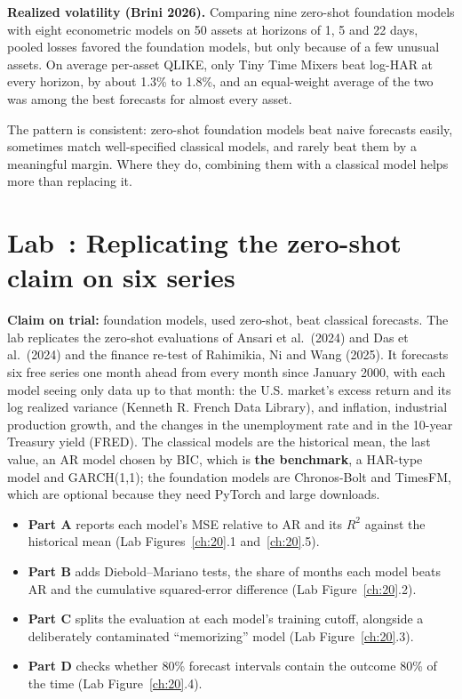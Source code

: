 \textbf{Realized volatility (Brini 2026).} Comparing nine zero-shot foundation models with eight econometric models on 50 assets at horizons of 1, 5 and 22 days, pooled losses favored the foundation models, but only because of a few unusual assets. On average per-asset QLIKE, only Tiny Time Mixers beat log-HAR at every horizon, by about 1.3\% to 1.8\%, and an equal-weight average of the two was among the best forecasts for almost every asset.

The pattern is consistent: zero-shot foundation models beat naive forecasts easily, sometimes match well-specified classical models, and rarely beat them by a meaningful margin. Where they do, combining them with a classical model helps more than replacing it.

\section{Lab~\thechapter: Replicating the zero-shot claim on six series}
\label{sec:21-lab}

\textbf{Claim on trial:} foundation models, used zero-shot, beat classical forecasts. The lab replicates the zero-shot evaluations of Ansari et al.\ (2024) and Das et al.\ (2024) and the finance re-test of Rahimikia, Ni and Wang (2025). It forecasts six free series one month ahead from every month since January 2000, with each model seeing only data up to that month: the U.S. market's excess return and its log realized variance (Kenneth R. French Data Library), and inflation, industrial production growth, and the changes in the unemployment rate and in the 10-year Treasury yield (FRED). The classical models are the historical mean, the last value, an AR model chosen by BIC, which is \textbf{the benchmark}, a HAR-type model and GARCH(1,1); the foundation models are Chronos-Bolt and TimesFM, which are optional because they need PyTorch and large downloads.

\begin{itemize}
  \item \textbf{Part A} reports each model's MSE relative to AR and its $R^2$ against the historical mean (Lab Figures~\ref{ch:20}.1 and~\ref{ch:20}.5).
  \item \textbf{Part B} adds Diebold--Mariano tests, the share of months each model beats AR and the cumulative squared-error difference (Lab Figure~\ref{ch:20}.2).
  \item \textbf{Part C} splits the evaluation at each model's training cutoff, alongside a deliberately contaminated ``memorizing'' model (Lab Figure~\ref{ch:20}.3).
  \item \textbf{Part D} checks whether 80\% forecast intervals contain the outcome 80\% of the time (Lab Figure~\ref{ch:20}.4).
\end{itemize}

